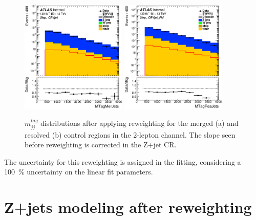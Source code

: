 \begin{figure}[ht]
    \centering
    \includegraphics[width=0.45\textwidth]{figures/2lep/reweighting/after_reweighting/C_0ptag1pfat0pjet_0ptv_CRVjet_MTagMerJets_Log.eps}
    \includegraphics[width=0.45\textwidth]{figures/2lep/reweighting/after_reweighting/C_0ptag2pjet_0ptv_CRVjet_Fid_MTagResJets_Log.eps}
    \caption{ $m^{tag}_{jj}$ distributions after applying reweighting for the merged (a) and resolved (b) control regions in the 2-lepton channel. The slope seen before reweighting is corrected in the Z+jet CR.}
    \label{fig:2lep_mtag_before_rw}
\end{figure}

The uncertainty for this reweighting is assigned in the fitting, considering a 100~\% uncertainty on the linear fit parameters.


\section{Z+jets modeling after reweighting}

